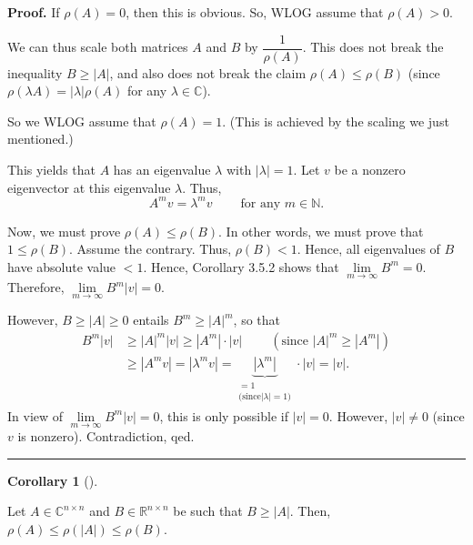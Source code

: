 \documentclass[numbers=enddot,12pt,final,onecolumn,notitlepage]{scrartcl}%
\numberwithin{exer}{subsection}
\theoremstyle{definition}
\newtheorem{coro}[theo]{Corollary}
\newenvironment{corollary}[1][]
{\begin{coro}[#1]\begin{leftbar}}
{\end{leftbar}\end{coro}}
\newenvironment{proof}[1][Proof]{\noindent\textbf{#1.} }{\ \rule{0.5em}{0.5em}}
\begin{document}
\begin{proof}
If $\rho\left(  A\right)  =0$, then this is obvious. So, WLOG assume that
$\rho\left(  A\right)  >0$.

We can thus scale both matrices $A$ and $B$ by $\dfrac{1}{\rho\left(
A\right)  }$. This does not break the inequality $B\geq\left\vert A\right\vert
$, and also does not break the claim $\rho\left(  A\right)  \leq\rho\left(
B\right)  $ (since $\rho\left(  \lambda A\right)  =\left\vert \lambda
\right\vert \rho\left(  A\right)  $ for any $\lambda\in\mathbb{C}$).

So we WLOG assume that $\rho\left(  A\right)  =1$. (This is achieved by the
scaling we just mentioned.)

This yields that $A$ has an eigenvalue $\lambda$ with $\left\vert
\lambda\right\vert =1$. Let $v$ be a nonzero eigenvector at this eigenvalue
$\lambda$. Thus,%
\[
A^{m}v=\lambda^{m}v\ \ \ \ \ \ \ \ \ \ \text{for any }m\in\mathbb{N}.
\]


Now, we must prove $\rho\left(  A\right)  \leq\rho\left(  B\right)  $. In
other words, we must prove that $1\leq\rho\left(  B\right)  $. Assume the
contrary. Thus, $\rho\left(  B\right)  <1$. Hence, all eigenvalues of $B$ have
absolute value $<1$. Hence, Corollary 3.5.2 shows that $\lim
\limits_{m\rightarrow\infty}B^{m}=0$. Therefore, $\lim\limits_{m\rightarrow
\infty}B^{m}\left\vert v\right\vert =0$.

However, $B\geq\left\vert A\right\vert \geq0$ entails $B^{m}\geq\left\vert
A\right\vert ^{m}$, so that%
\begin{align*}
B^{m}\left\vert v\right\vert  & \geq\left\vert A\right\vert ^{m}\left\vert
v\right\vert \geq\left\vert A^{m}\right\vert \cdot\left\vert v\right\vert
\ \ \ \ \ \ \ \ \ \ \left(  \text{since }\left\vert A\right\vert ^{m}%
\geq\left\vert A^{m}\right\vert \right)  \\
& \geq\left\vert A^{m}v\right\vert =\left\vert \lambda^{m}v\right\vert
=\underbrace{\left\vert \lambda^{m}\right\vert }_{\substack{=1\\\text{(since
}\left\vert \lambda\right\vert =1\text{)}}}\cdot\left\vert v\right\vert
=\left\vert v\right\vert .
\end{align*}
In view of $\lim\limits_{m\rightarrow\infty}B^{m}\left\vert v\right\vert =0$,
this is only possible if $\left\vert v\right\vert =0$. However, $\left\vert
v\right\vert \neq0$ (since $v$ is nonzero). Contradiction, qed.
\end{proof}

\begin{corollary}
Let $A\in\mathbb{C}^{n\times n}$ and $B\in\mathbb{R}^{n\times n}$ be such that
$B\geq\left\vert A\right\vert $. Then, $\rho\left(  A\right)  \leq\rho\left(
\left\vert A\right\vert \right)  \leq\rho\left(  B\right)  $.
\end{corollary}
\end{document}
